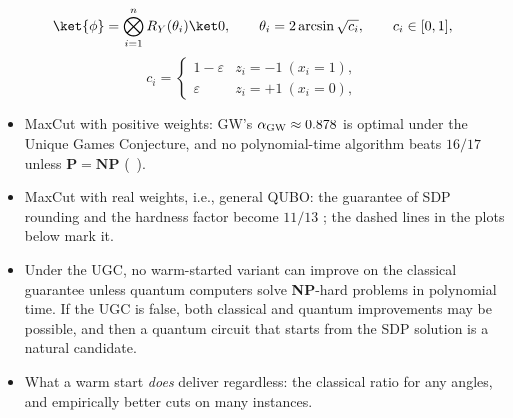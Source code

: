 \documentclass[handoutsbeamer.tex]{subfiles}
\begin{document}
\begin{frame}
\begin{equation}\label{eq:ch10:init}
    \ket{\phi} = \bigotimes_{i=1}^n R_Y(\theta_i)\ket0, \qquad \theta_i = 2\arcsin\sqrt{c_i},\qquad c_i \in [0,1],
\end{equation}
\begin{equation}\label{eq:ch10:eps}
    c_i = \begin{cases}1-\varepsilon & z_i = -1\ (x_i = 1),\\ \varepsilon & z_i = +1\ (x_i = 0),\end{cases}
\end{equation}
\end{frame}

\begin{frame}
\begin{itemize}\setlength\itemsep{0.3em}
    \item MaxCut with positive weights: GW's $\alpha_{\rm GW} \approx 0.878$ is optimal under the Unique Games Conjecture, and no polynomial-time algorithm beats $16/17$ unless $\mathbf P = \mathbf{NP}$ (\Chap~).
    \item MaxCut with real weights, i.e., general QUBO: the guarantee of SDP rounding and the hardness factor become $11/13$ \citep{charikar2004maximizing}; the dashed lines in the plots below mark it.
    \item Under the UGC, no warm-started variant can improve on the classical guarantee unless quantum computers solve \textbf{NP}-hard problems in polynomial time. If the UGC is false, both classical and quantum improvements may be possible, and then a quantum circuit that starts from the SDP solution is a natural candidate.
    \item What a warm start \emph{does} deliver regardless: the classical ratio for any angles, and empirically better cuts on many instances.
\end{itemize}
\end{frame}
\end{document}
